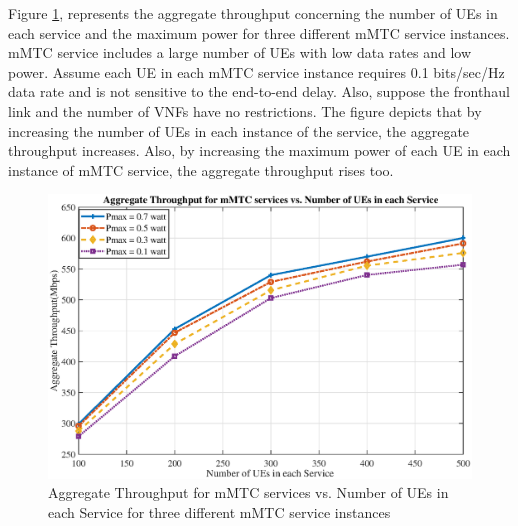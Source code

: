 \documentclass[conference]{IEEEtran}
\begin{document}
Figure \ref{fig:8}, represents the aggregate throughput concerning the number of UEs in each service and the maximum power for three different mMTC service instances. mMTC service includes a large number of UEs with low data rates and low power. 
Assume each UE in each mMTC service instance requires 0.1 bits/sec/Hz data rate and is not sensitive to the end-to-end delay. Also, suppose the fronthaul link and the number of VNFs have no restrictions.
The figure depicts that by increasing the number of UEs in each instance of the service, the aggregate throughput increases. 
Also, by increasing the maximum power of each UE in each instance of mMTC service, the aggregate throughput rises too.
\begin{figure}
    \includegraphics[scale = 0.4]{AmmTCpower.eps}
  \caption{Aggregate Throughput for mMTC services vs. Number of UEs in each Service for three different mMTC service instances}
  \label{fig:8}
\end{figure}
\end{document}
